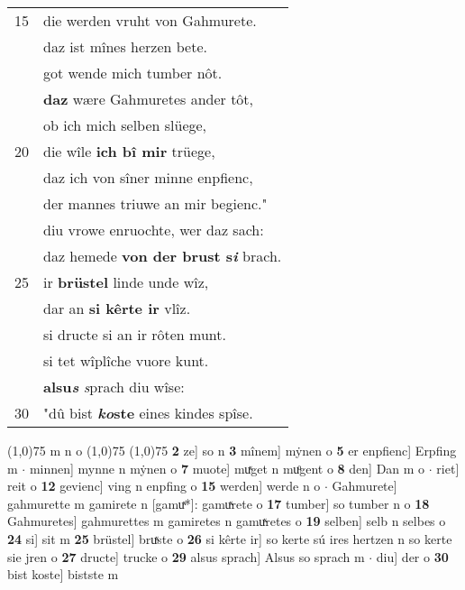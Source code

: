 \documentclass[8pt,a4paper,notitlepage]{article}
\begin{document}
\begin{table}[ht]
\begin{minipage}[t]{0.5\linewidth}
\begin{tabular}{rl}
15 & die werden vruht von Gahmurete.\\ 
 & daz ist mînes herzen bete.\\ 
 & got wende mich tumber nôt.\\ 
 & \textbf{daz} wære Gahmuretes ander tôt,\\ 
 & ob ich mich selben slüege,\\ 
20 & die wîle \textbf{ich bî mir} trüege,\\ 
 & daz ich von sîner minne enpfienc,\\ 
 & der mannes triuwe an mir begienc."\\ 
 & diu vrowe enruochte, wer daz sach:\\ 
 & daz hemede \textbf{von der brust s\textit{i}} brach.\\ 
25 & ir \textbf{brüstel} linde unde wîz,\\ 
 & dar an \textbf{si kêrte ir} vlîz.\\ 
 & si dructe si an ir rôten munt.\\ 
 & si tet wîplîche vuore kunt.\\ 
 & \textbf{alsu\textit{s}} \textit{s}prach diu wîse:\\ 
30 & "dû bist \textbf{\textit{ko}ste} eines kindes spîse.\\ 
\end{tabular}
\scriptsize
\line(1,0){75} \newline
m n o \newline
\line(1,0){75} \newline
\newline
\line(1,0){75} \newline
\textbf{2} ze] so n \textbf{3} mînem] mẏnen o \textbf{5} er enpfienc] Erpfing m  $\cdot$ minnen] mynne n mẏnen o \textbf{7} muote] muͯget n muͦgent o \textbf{8} den] Dan m o  $\cdot$ riet] reit o \textbf{12} gevienc] ving n enpfing o \textbf{15} werden] werde n o  $\cdot$ Gahmurete] gahmurette m gamirete n [gamuͯ*]: gamuͯrete o \textbf{17} tumber] so tumber n o \textbf{18} Gahmuretes] gahmurettes m gamiretes n gamuͯretes o \textbf{19} selben] selb n selbes o \textbf{24} si] sit m \textbf{25} brüstel] bruͯste o \textbf{26} si kêrte ir] so kerte sú ires hertzen n so kerte sie jren o \textbf{27} dructe] trucke o \textbf{29} alsus sprach] Alsus so sprach m  $\cdot$ diu] der o \textbf{30} bist koste] bistste m \newline
\end{minipage}
\end{table}
\newpage
\end{document}
